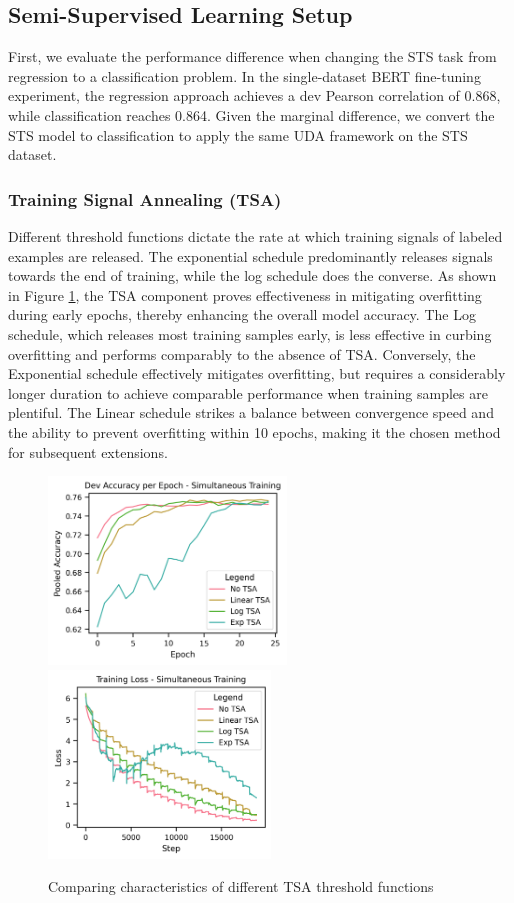 \documentclass{article}
\begin{document}
\subsection{Semi-Supervised Learning Setup}
First, we evaluate the performance difference when changing the STS task from regression 
to a classification problem. In the single-dataset BERT 
fine-tuning experiment, the regression approach achieves a dev Pearson correlation of 0.868, 
while classification reaches 0.864. Given the marginal difference, we convert the STS model 
to classification to apply the same UDA framework on the STS dataset.

\subsubsection{Training Signal Annealing (TSA)}
Different threshold functions dictate the rate at which training signals of labeled 
examples are released. The exponential schedule predominantly releases signals towards 
the end of training, while the log schedule does the converse. As shown in Figure 
\ref{fig:tsa}, the TSA component proves effectiveness in mitigating overfitting during 
early epochs, thereby enhancing the overall model accuracy.
The Log schedule, which releases most training samples early, is less effective in 
curbing overfitting and performs comparably to the absence of TSA. Conversely, the 
Exponential schedule effectively mitigates overfitting, but requires a considerably 
longer duration to achieve comparable performance when training samples are plentiful.
The Linear schedule strikes a balance between convergence speed and the ability to 
prevent overfitting within 10 epochs, making it the chosen method for subsequent extensions.

\begin{figure}[H]%
  \centering
  \subfloat
  {{\includegraphics[height=5cm]{pics/tsa-simul-dev.png} }}%
  \qquad
  \subfloat
  {{\includegraphics[height=5cm]{pics/tsa-simul-loss.png} }}%
  \caption{Comparing characteristics of different TSA threshold functions}%
  \label{fig:tsa}%
\end{figure}
\end{document}
